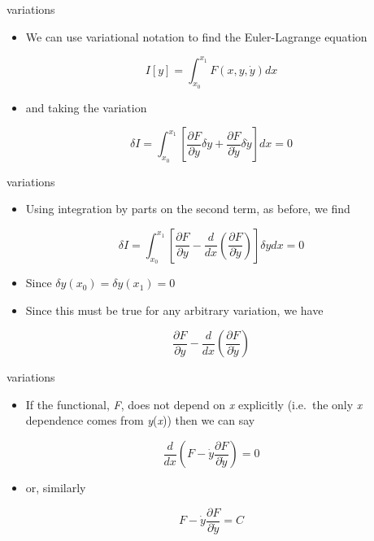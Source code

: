 \documentclass[
  letterpaper,
  ignorenonframetext,
  aspectratio=43,
  handout,
  12pt]{beamer}
\providecommand{\tightlist}{%
  \setlength{\itemsep}{0pt}\setlength{\parskip}{0pt}}
\providecommand{\tightlist}{%
\setlength{\itemsep}{0pt}\setlength{\parskip}{0pt}}
\begin{document}
\begin{frame}{variations}
\protect\hypertarget{variations-4}{}
\begin{itemize}
\tightlist
\item
  We can use variational notation to find the Euler-Lagrange equation
\end{itemize}

\[I[y] = \int_{x_0}^{x_1} F(x,y,\dot{y})dx\]

\begin{itemize}
\tightlist
\item
  and taking the variation
\end{itemize}

\[\delta I = \int_{x_0}^{x_1} \left[  \frac{\partial F}{\partial y} \delta y + \frac{\partial F}{\partial \dot{y}} \delta \dot{y}\right]dx = 0\]
\end{frame}

\begin{frame}{variations}
\protect\hypertarget{variations-5}{}
\begin{itemize}
\tightlist
\item
  Using integration by parts on the second term, as before, we find
\end{itemize}

\[\delta I = \int_{x_0}^{x_1} \left[  \frac{\partial F}{\partial y} - \frac{d}{dx}\left(\frac{\partial F}{\partial \dot{y}}\right) \right]\delta y dx = 0\]

\begin{itemize}
\tightlist
\item
  Since \(\delta y (x_0) = \delta y (x_1) = 0\)
\item
  Since this must be true for any arbitrary variation, we have
\end{itemize}

\[\frac{\partial F}{\partial y} - \frac{d}{dx}\left(\frac{\partial F}{\partial \dot{y}}\right)\]
\end{frame}

\begin{frame}{variations}
\protect\hypertarget{variations-6}{}
\begin{itemize}
\tightlist
\item
  If the functional, \emph{F}, does not depend on \emph{x} explicitly
  (i.e.~the only \emph{x} dependence comes from \emph{y}(\emph{x})) then
  we can say
\end{itemize}

\[\frac{d}{dx}\left( F - \dot{y} \frac{\partial F}{\partial \dot{y}}\right) = 0\]

\begin{itemize}
\tightlist
\item
  or, similarly
\end{itemize}

\[F - \dot{y} \frac{\partial F}{\partial \dot{y}} = C\]
\end{frame}
\end{document}
